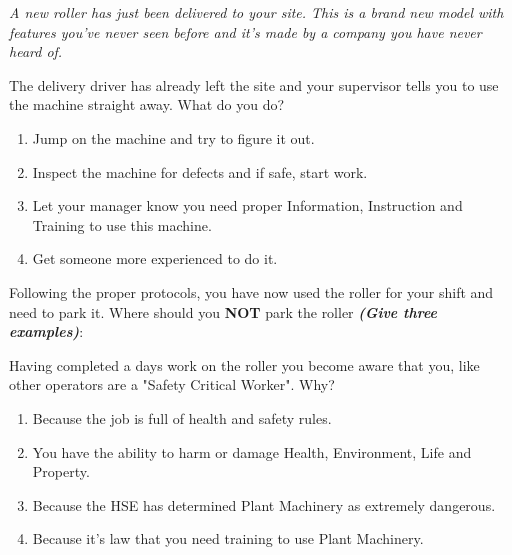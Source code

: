 \begin{Scenario}
\textit{A new roller has just been delivered to your site. This is a brand new model with features you've never seen before and it's made by a company you have never heard of.}
\end{Scenario}

\begin{exercise}
     The delivery driver has already left the site and your supervisor tells you to use the machine straight away. What do you do?
\end{exercise}

 \begin{enumerate}[A] %
     \item Jump on the machine and try to figure it out.
     \item Inspect the machine for defects and if safe, start work.
     \item Let your manager know you need proper Information, Instruction and Training to use this machine.
     \item Get someone more experienced to do it.
 \end{enumerate}

\vspace{10px}%

\begin{exercise}
      Following the proper protocols, you have now used the roller for your shift and need to park it. Where should you \textbf{NOT} park the roller \textbf{\textit{(Give three examples)}}:
\end{exercise}
 \begin{Answer}
    \vspace{75pt}
 \end{Answer}
 
\vspace{10px}%

\begin{exercise}
     Having completed a days work on the roller you become aware that you, like other operators are a "Safety Critical Worker". Why?
\end{exercise}
 \begin{enumerate}[A] %
     \item Because the job is full of health and safety rules.
     \item You have the ability to harm or damage Health, Environment, Life and Property.
     \item Because the HSE has determined Plant Machinery as extremely dangerous.
     \item Because it's law that you need training to use Plant Machinery.
 \end{enumerate}
 
